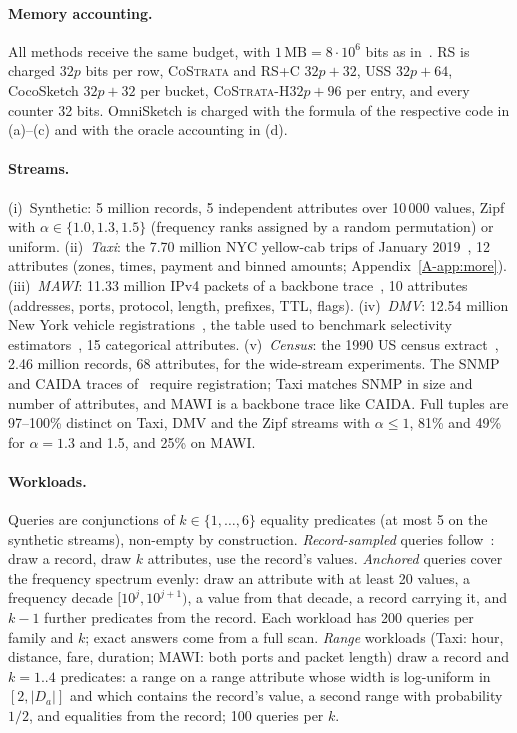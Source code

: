 \documentclass[sigconf]{acmart}
\newcommand{\cs}{\textsc{CoStrata}\xspace}
\newcommand{\csh}{\textsc{CoStrata-H}\xspace}
\newcommand{\omni}{OmniSketch\xspace}
\newcommand{\apx}[1]{Appendix~\ref{A-#1}}
\begin{document}
\paragraph{Memory accounting.} All methods receive the same budget, with $1\,\mathrm{MB}=8\cdot10^{6}$
bits as in~\cite{omni}. RS is charged $32p$ bits per row, \cs and \textsc{RS+C} $32p+32$, USS $32p+64$, CocoSketch
$32p+32$ per bucket, \csh $32p+96$ per entry, and every counter 32 bits. \omni is charged with the formula
of the respective code in (a)--(c) and with the oracle accounting in (d).

\paragraph{Streams.} (i)~Synthetic: 5 million records, 5 independent attributes over 10\,000 values,
Zipf with $\alpha\in\{1.0,1.3,1.5\}$ (frequency ranks assigned by a random permutation) or uniform.
(ii)~\emph{Taxi}: the 7.70 million NYC yellow-cab trips of January 2019~\cite{taxi}, 12 attributes
(zones, times, payment and binned amounts; \apx{app:more}). (iii)~\emph{MAWI}: 11.33 million IPv4 packets
of a backbone trace~\cite{mawi}, 10 attributes (addresses, ports, protocol, length, prefixes, TTL, flags).
(iv)~\emph{DMV}: 12.54 million New York vehicle registrations~\cite{dmv}, the table used
to benchmark selectivity estimators~\cite{naru}, 15 categorical attributes.
(v)~\emph{Census}: the 1990 US census extract~\cite{census}, 2.46 million records, 68 attributes, for the
wide-stream experiments. The SNMP and CAIDA traces of~\cite{omni} require registration; Taxi matches SNMP
in size and number of attributes, and MAWI is a backbone trace like CAIDA. Full tuples are 97--100\%
distinct on Taxi, DMV and the Zipf streams with $\alpha\le1$, 81\% and 49\% for $\alpha=1.3$ and 1.5, and
25\% on MAWI.

\paragraph{Workloads.} Queries are conjunctions of $k\in\{1,\dots,6\}$ equality predicates (at most 5 on the
synthetic streams), non-empty by construction. \emph{Record-sampled} queries follow~\cite{omni}: draw a
record, draw $k$ attributes, use the record's values. \emph{Anchored} queries cover the frequency spectrum
evenly: draw an attribute with at least 20 values, a frequency decade $[10^j,10^{j+1})$, a value from that
decade, a record carrying it, and $k-1$ further predicates from the record. Each workload has 200 queries
per family and $k$; exact answers come from a full scan. \emph{Range} workloads (Taxi: hour, distance, fare,
duration; MAWI: both ports and packet length) draw a record and $k=1..4$ predicates: a range on a range
attribute whose width is log-uniform in $[2,|D_a|]$ and which contains the record's value, a second range
with probability $1/2$, and equalities from the record; 100 queries per $k$.
\end{document}
